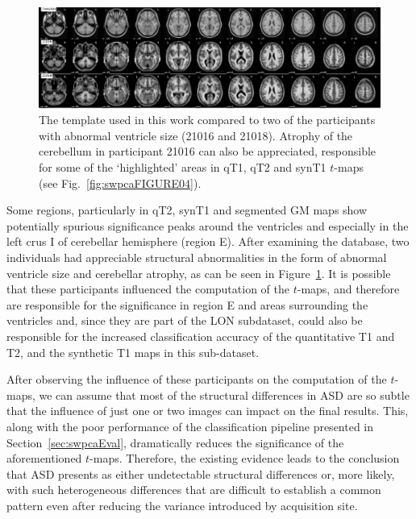 \begin{figure}
	\centering
	\includegraphics[width=\linewidth]{Graphics/ch7/FIGURE07}
	\caption[The template used in this work compared to two of the participants with abnormal ventricle size (21016 and 21018).]{The template used in this work compared to two of the participants with abnormal ventricle size (21016 and 21018). Atrophy of the cerebellum in participant 21016 can also be appreciated, responsible for some of the `highlighted' areas in \acs{qT1}, \acs{qT2} and \ac{synT1} $t$-maps (see Fig.~\ref{fig:swpcaFIGURE04}).}
	\label{fig:swpcaFIGURE07}
\end{figure}

Some regions, particularly in \ac{qT2}, \ac{synT1} and segmented \ac{GM} maps show potentially spurious significance peaks around the ventricles and especially in the left crus I of cerebellar hemisphere (region E). After examining the database, two individuals had appreciable structural abnormalities in the form of abnormal ventricle size and cerebellar atrophy, as can be seen in Figure~\ref{fig:swpcaFIGURE07}. It is possible that these participants influenced the computation of the $t$-maps, and therefore are responsible for the significance in region E and areas surrounding the ventricles and, since they are part of the LON subdataset, could also be responsible for the increased classification accuracy of the quantitative T1 and T2, and the synthetic T1 maps in this sub-dataset.

After observing the influence of these participants on the computation of the $t$-maps, we can assume that most of the structural differences in \ac{ASD} are so subtle that the influence of just one or two images can impact on the final results. This, along with the poor performance of the classification pipeline presented in Section~\ref{sec:swpcaEval}, dramatically reduces the significance of the aforementioned $t$-maps. Therefore, the existing evidence leads to the conclusion that \ac{ASD} presents as either undetectable structural differences or, more likely, with such heterogeneous differences that are difficult to establish a common pattern even after reducing the variance introduced by acquisition site. 

